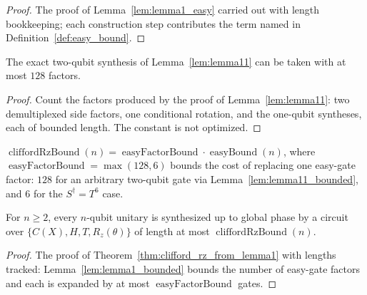 \begin{proof}
  \leanok
  The proof of Lemma~\ref{lem:lemma1_easy} carried out with length bookkeeping;
  each construction step contributes the term named in
  Definition~\ref{def:easy_bound}.
\end{proof}

\begin{lemma}
  \label{lem:lemma11_bounded}
  \leanok
  The exact two-qubit synthesis of Lemma~\ref{lem:lemma11} can be taken with at
  most $128$ factors.
\end{lemma}

\begin{proof}
  \leanok
  Count the factors produced by the proof of Lemma~\ref{lem:lemma11}: two
  demultiplexed side factors, one conditional rotation, and the one-qubit
  syntheses, each of bounded length.  The constant is not optimized.
\end{proof}

\begin{definition}
  \label{def:crz_total_bound}
  \leanok
  $\operatorname{cliffordRzBound}(n)
     = \operatorname{easyFactorBound} \cdot \operatorname{easyBound}(n)$,
  where $\operatorname{easyFactorBound} = \max(128, 6)$ bounds the cost of
  replacing one easy-gate factor: $128$ for an arbitrary two-qubit gate via
  Lemma~\ref{lem:lemma11_bounded}, and $6$ for the $S^\dagger = T^6$ case.
\end{definition}

\begin{lemma}
  \label{lem:cliffordrz_bounded}
  \leanok
  For $n \ge 2$, every $n$-qubit unitary is synthesized up to global phase by a
  circuit over $\{C(X),H,T,R_z(\theta)\}$ of length at most
  $\operatorname{cliffordRzBound}(n)$.
\end{lemma}

\begin{proof}
  \leanok
  The proof of Theorem~\ref{thm:clifford_rz_from_lemma1} with lengths tracked:
  Lemma~\ref{lem:lemma1_bounded} bounds the number of easy-gate factors and
  each is expanded by at most $\operatorname{easyFactorBound}$ gates.
\end{proof}

